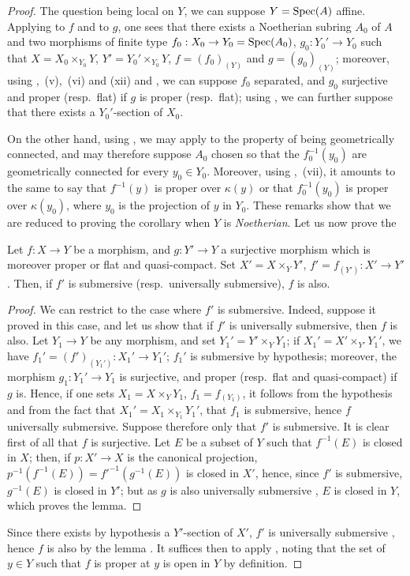 \begin{proof}
The question being local on $Y$, we can suppose $Y=\operatorname{Spec}(A)$ affine.
Applying  to $f$ and to $g$, one sees that there exists a Noetherian subring $A_0$ of $A$ and two morphisms of finite type $f_0:X_0\to Y_0=\operatorname{Spec}(A_0)$, $g_0:Y_0'\to Y_0$ such that $X=X_0\times_{Y_0}Y$, $Y'=Y_0'\times_{Y_0}Y$, $f=(f_0)_{(Y)}$ and $g=(g_0)_{(Y)}$; moreover, using ,~(v),~(vi) and (xii) and , we can suppose $f_0$ separated, and $g_0$ surjective and proper (resp.\ flat) if $g$ is proper (resp.\ flat); using , we can further suppose that there exists a $Y_0'$-section of $X_0$.

On the other hand, using , we may apply  to the property of being geometrically connected, and may therefore suppose $A_0$ chosen so that the $f_0^{-1}(y_0)$ are geometrically connected for every $y_0\in Y_0$.
Moreover, using ,~(vii), it amounts to the same to say that $f^{-1}(y)$ is proper over $\kappa(y)$ or that $f_0^{-1}(y_0)$ is proper over $\kappa(y_0)$, where $y_0$ is the projection of $y$ in $Y_0$.
These remarks show that we are reduced to proving the corollary when $Y$ is \emph{Noetherian}.
Let us now prove the

\begin{lemma}[15.7.11.1]
\label{IV.15.7.11.1}
Let $f:X\to Y$ be a morphism, and $g:Y'\to Y$ a surjective morphism which is moreover proper or flat and quasi-compact.
Set $X'=X\times_Y Y'$, $f'=f_{(Y')}:X'\to Y'$.
Then, if $f'$ is submersive (resp.\ universally submersive), $f$ is also.
\end{lemma}

\begin{proof}
We can restrict to the case where $f'$ is submersive.
Indeed, suppose it proved in this case, and let us show that if $f'$ is universally submersive, then $f$ is also.
Let $Y_1\to Y$ be any morphism, and set $Y_1'=Y'\times_Y Y_1$; if $X_1'=X'\times_{Y'} Y_1'$, we have $f_1'=(f')_{(Y_1')}:X_1'\to Y_1'$; $f_1'$ is submersive by hypothesis; moreover, the morphism $g_1:Y_1'\to Y_1$ is surjective, and proper (resp.\ flat and quasi-compact) if $g$ is.
Hence, if one sets $X_1=X\times_Y Y_1$, $f_1=f_{(Y_1)}$, it follows from the hypothesis and from the fact that $X_1'=X_1\times_{Y_1} Y_1'$, that $f_1$ is submersive, hence $f$ universally submersive.
Suppose therefore only that $f'$ is submersive.
It is clear first of all that $f$ is surjective.
Let $E$ be a subset of $Y$ such that $f^{-1}(E)$ is closed in $X$; then, if $p:X'\to X$ is the canonical projection,
$p^{-1}(f^{-1}(E))=f'^{-1}(g^{-1}(E))$ is closed in $X'$, hence, since $f'$ is submersive, $g^{-1}(E)$ is closed in $Y'$; but as $g$ is also universally submersive , $E$ is closed in $Y$, which proves the lemma.
\end{proof}

Since there exists by hypothesis a $Y'$-section of $X'$, $f'$ is universally submersive , hence $f$ is also by the lemma .
It suffices then to apply , noting that the set of $y\in Y$ such that $f$ is proper at $y$ is open in $Y$ by definition.
\end{proof}


